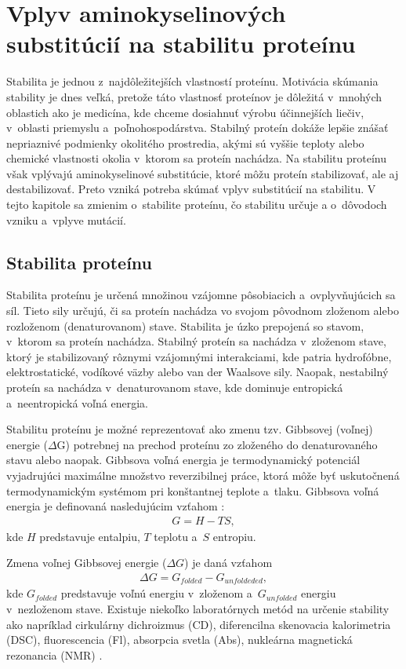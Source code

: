 \chapter{Vplyv aminokyselinových substitúcií na stabilitu proteínu}

Stabilita je jednou z~najdôležitejších vlastností proteínu. Motivácia skúmania stability je dnes veľká, pretože táto vlastnosť proteínov je dôležitá v~mnohých oblastich ako je medicína, kde chceme dosiahnuť výrobu účinnejších liečiv, v~oblasti priemyslu a~poľnohospodárstva. Stabilný proteín dokáže lepšie znášať nepriaznivé podmienky okolitého prostredia, akými sú vyššie teploty alebo chemické vlastnosti okolia v~ktorom sa proteín nachádza. Na stabilitu proteínu však vplývajú aminokyselinové substitúcie, ktoré môžu proteín stabilizovať, ale aj destabilizovať. Preto vzniká potreba skúmať vplyv substitúcií na stabilitu. V tejto kapitole sa zmienim o~stabilite proteínu, čo stabilitu určuje a o~dôvodoch vzniku a~vplyve mutácií.


\section{Stabilita proteínu}
Stabilita proteínu je určená množinou vzájomne pôsobiacich a~ovplyvňujúcich sa síl. Tieto sily určujú, či sa proteín nachádza vo svojom pôvodnom zloženom alebo rozloženom (denaturovanom) stave. Stabilita je úzko prepojená so stavom, v~ktorom sa proteín nachádza. Stabilný proteín sa nachádza v~zloženom stave, ktorý je stabilizovaný rôznymi vzájomnými interakciami, kde patria hydrofóbne, elektrostatické, vodíkové väzby alebo van der Waalsove sily. Naopak, nestabilný proteín sa nachádza v~denaturovanom stave, kde dominuje entropická a~neentropická voľná energia. \cite{gromiha}

Stabilitu proteínu je možné reprezentovať ako zmenu tzv. Gibbsovej (voľnej) energie ($\Delta$G) potrebnej na prechod proteínu zo zloženého do denaturovaného stavu alebo naopak. 
Gibbsova voľná energia je termodynamický potenciál vyjadrujúci maximálne množstvo reverzibilnej práce, ktorá môže byť uskutočnená termodynamickým systémom pri konštantnej teplote a~tlaku. Gibbsova voľná energia je definovaná nasledujúcim vzťahom \cite{gibbs}:
\begin{align}
	G = H - TS,
\end{align}
kde $H$ predstavuje entalpiu, $T$ teplotu a~$S$ entropiu.

Zmena voľnej Gibbsovej energie ($\Delta G$) je daná vzťahom
\begin{align}
	\Delta G = G_{folded} - G_{unfoldeded},
\end{align}
kde $G_{folded}$ predstavuje voľnú energiu v~zloženom a~$G_{unfolded}$ energiu v~nezloženom stave.
Existuje niekoľko laboratórnych metód na určenie stability ako napríklad cirkulárny dichroizmus (CD), diferencilna skenovacia kalorimetria (DSC), fluorescencia (Fl), absorpcia svetla (Abs), nukleárna magnetická rezonancia (NMR) \cite{gromiha}.

